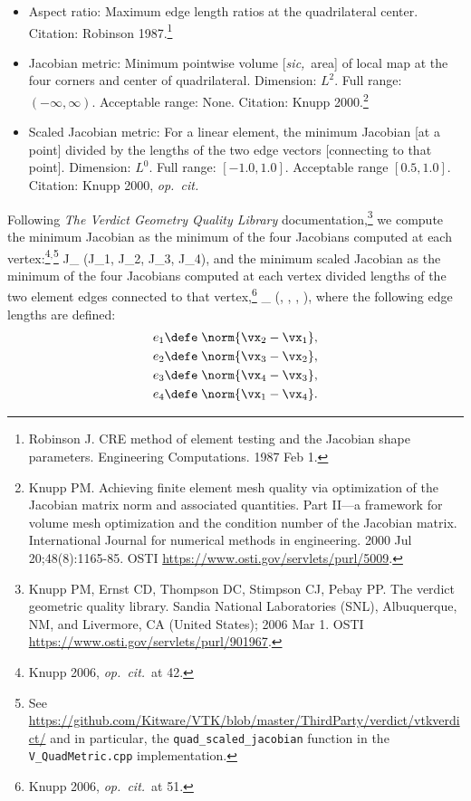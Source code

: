 \documentclass[14pt,letterpaper,fleqn]{extreport}
\begin{document}
\begin{itemize}
    \item Aspect ratio: Maximum edge length ratios at the quadrilateral center.  Citation: Robinson 1987.\footnote{Robinson J. CRE method of element testing and the Jacobian shape parameters. Engineering Computations. 1987 Feb 1.}
  \item Jacobian metric: Minimum pointwise volume [{\em sic,}~area] of local map at the four corners and center of quadrilateral.  Dimension: $L^2$.  Full range: $(-\infty, \infty)$.  Acceptable range: None.  Citation: Knupp 2000.\footnote{Knupp PM. Achieving finite element mesh quality via optimization of the Jacobian matrix norm and associated quantities. Part II—a framework for volume mesh optimization and the condition number of the Jacobian matrix. International Journal for numerical methods in engineering. 2000 Jul 20;48(8):1165-85. OSTI \href{link}{https://www.osti.gov/servlets/purl/5009}.}%
  \item Scaled Jacobian metric: For a linear element, the minimum Jacobian [at a point] divided by the lengths of the two edge vectors [connecting to that point].  Dimension: $L^0$.  Full range: $[-1.0, 1.0]$.  Acceptable range $[0.5, 1.0]$.  Citation: Knupp 2000, {\em op.~cit.}
\end{itemize}

Following {\em The Verdict Geometry Quality 
Library} documentation,\footnote{Knupp PM, Ernst CD, Thompson DC, Stimpson CJ, Pebay PP. 
The verdict geometric quality library. Sandia National Laboratories (SNL), 
Albuquerque, NM, and Livermore, CA (United States); 2006 Mar 1.  
OSTI \href{link}{https://www.osti.gov/servlets/purl/901967}.} 
we compute the minimum Jacobian as the minimum of the four Jacobians computed 
at each vertex:\footnote{Knupp 2006, {\em op.~cit.}~at 
42.}$^{,}$\footnote{See 
\href{link}{https://github.com/Kitware/VTK/blob/master/ThirdParty/verdict/vtkverdict/}
and in particular, the {\tt quad\_scaled\_jacobian} function in the {\tt V\_QuadMetric.cpp} implementation.}%
\be 
J_{\min}  \min(J_1, J_2, J_3, J_4),
\ee 
and the minimum scaled Jacobian as the minimum of the four Jacobians computed at 
each vertex divided lengths of the two element edges connected 
to that vertex,\footnote{Knupp 2006, {\em op.~cit.}~at 51.}
\be 
{}_{\min}  \min\left(, , 
, \right),
\ee 
where the following edge lengths are defined:
\begin{align}
e_1 &\defe \; \norm{\vx_2 - \vx_1}, \\
e_2 &\defe \; \norm{\vx_3 - \vx_2}, \\
e_3 &\defe \; \norm{\vx_4 - \vx_3}, \\
e_4 &\defe \; \norm{\vx_1 - \vx_4}.
\end{align}
\end{document}
